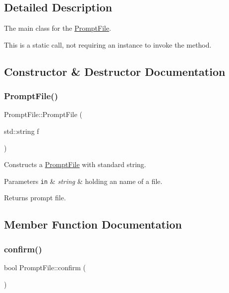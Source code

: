 \subsection{Detailed Description}
The main class for the \hyperlink{classPromptFile}{Prompt\+File}. 

This is a static call, not requiring an instance to invoke the method. 

\subsection{Constructor \& Destructor Documentation}
\mbox{\label{classPromptFile_aba6c0006f00f3b69a96155e6ad8a34dd}} 
\subsubsection{\texorpdfstring{Prompt\+File()}{PromptFile()}}
{\footnotesize\ttfamily Prompt\+File\+::\+Prompt\+File (\begin{DoxyParamCaption}\item[{std\+::string}]{f }\end{DoxyParamCaption})}



Constructs a \hyperlink{classPromptFile}{Prompt\+File} with standard string. 


\begin{DoxyParams}[1]{Parameters}
\mbox{\tt in}  & {\em string} & holding an name of a file.\\
\hline
\end{DoxyParams}
\begin{DoxyReturn}{Returns}
prompt file. 
\end{DoxyReturn}


\subsection{Member Function Documentation}
\mbox{\label{classPromptFile_a9253bfa35b99abbf61cbd55212b7461b}} 
\subsubsection{\texorpdfstring{confirm()}{confirm()}}
{\footnotesize\ttfamily bool Prompt\+File\+::confirm (\begin{DoxyParamCaption}{ }\end{DoxyParamCaption})}



